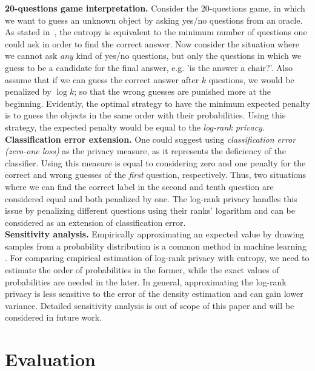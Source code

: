 \documentclass[10pt,journal,compsoc]{IEEEtran}
\newcommand{\alert}[1]{\textcolor{purple}{#1}}
\begin{document}
\textbf{20-questions game interpretation.} Consider the 20-questions game, in which we want to guess an unknown object by asking yes/no questions from an oracle. As stated in~\cite{cover2012}, the entropy is equivalent to the minimum number of questions one could ask in order to find the correct answer. Now consider the situation where we cannot ask \emph{any} kind of yes/no questions, but only the questions in which we guess to be a candidate for the final answer, e.g. 'is the answer a chair?'. Also assume that if we can guess the correct answer after $k$ questions, we would be penalized by $\log k$; so that the wrong guesses are punished more at the beginning. Evidently, the optimal strategy to have the minimum expected penalty is to guess the objects in the same order with their probabilities. Using this strategy, the expected penalty would be equal to the \emph{log-rank privacy}. \\


\textbf{Classification error extension.} One could suggest using \emph{classification error (zero-one loss)} as the privacy measure, as it represents the deficiency of the classifier. Using this measure is equal to considering zero and one penalty for the correct and wrong guesses of the \emph{first} question, respectively. Thus, two situations where we can find the correct label in the second and tenth question are considered equal and both penalized by one. The log-rank privacy handles this issue by penalizing different questions using their ranks' logarithm and can be considered as an extension of classification error. \\

\textbf{Sensitivity analysis.} Empirically approximating an expected value by drawing samples from a probability distribution is a common method in machine learning \cite{bishop2006}. For comparing empirical estimation of log-rank privacy with entropy, we need to estimate the order of probabilities in the former, while the exact values of probabilities are needed in the later. In general, approximating the log-rank privacy is less sensitive to the error of the density estimation and can gain lower variance. Detailed sensitivity analysis is out of scope of this paper and will be considered in future work. 
\section{Evaluation}\label{sec:eval}%
\end{document}
